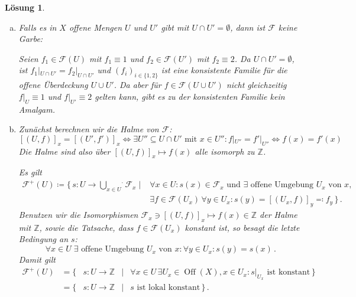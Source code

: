 \documentclass[a4paper,12pt]{report}
\theoremstyle{break}
\newtheorem{Loes}{L\"osung}
\theoremstyle{nonumberbreak}
\theoremstyle{nonumberplain}
\DeclareMathOperator{\Off}{Off}
\newcommand{\Z}{\mathbb{Z}}
\begin{document}
\begin{Loes}
\begin{enumerate}[a)]%
 \item Falls es in $X$ offene Mengen $U$ und $U'$ gibt mit $U \cap U' = \emptyset$, dann ist $\mathcal{F}$ keine Garbe:
 
 Seien $f_1 \in \mathcal{F}(U)$ mit $f_1 \equiv 1$ und $f_2 \in \mathcal{F}(U')$ mit $f_2 \equiv 2$. Da $U \cap U' = \emptyset$, ist $f_1|_{U \cap U'} = {f_2}|_{ U \cap U'}$ und $(f_i)_{i\in \{1,2\}}$ ist eine konsistente Familie f\"ur die offene \"Uberdeckung $U \cup U'$. Da aber f\"ur $f \in \mathcal{F}(U \cup U')$ nicht gleichzeitig $f|_U \equiv 1$ und $f|_{U'} \equiv 2$ gelten kann, gibt es zu der konsistenten Familie kein Amalgam.
 
 \item Zun\"achst berechnen wir die Halme von $\mathcal{F}$: 
 $$[(U,f)]_x = [(U',f')]_x \Leftrightarrow \exists U'' \subseteq U \cap U' \textrm{ mit } x \in U'' : f|_{U''} = f'|_{U''} \Leftrightarrow f(x) = f'(x)$$
 Die Halme sind also \"uber $[(U,f)]_x \mapsto f(x)$ alle isomorph zu $\Z$.
 
 Es gilt 
 $$\begin{array}{cl}
    \mathcal{F}^+(U) \coloneqq \{ \, s \colon U \to \stackrel{.}{\bigcup\limits_{x \in U}} \mathcal{F}_x \mid 
    & \forall x \in U : s(x) \in \mathcal{F}_x \textrm{ und } \exists \textrm{ offene Umgebung } U_x \textrm{ von } x, \\
    & \exists f \in \mathcal{F}(U_x) \, \forall y \in U_x : s(y) = [(U_x,f)]_y \eqqcolon f_y \, \} \, .
   \end{array}$$
 Benutzen wir die Isomorphismen $\mathcal{F}_x \ni [(U,f)]_x \mapsto f(x) \in \Z$ der Halme mit $\Z$, sowie die Tatsache, dass $f \in \mathcal{F}(U_x)$ konstant ist, so besagt die letzte Bedingung an $s$:
 $$\forall x \in U \; \exists \textrm{ offene Umgebung } U_x \textrm{ von } x: \forall y \in U_x: s(y) = s(x) \, .$$
 Damit gilt
  $$\begin{array}{rcccl}
    \mathcal{F}^+(U) &= \{ & s \colon U \to \Z &\mid 
    & \forall x \in U \, \exists U_x \in \Off(X), x \in U_x : s|_{U_x} \textrm{ ist konstant}\, \}\\
    &= \{ & s \colon U \to \Z & \mid & s \textrm{ ist lokal konstant} \, \} \, .
   \end{array}$$
\end{enumerate}
\end{Loes}
\end{document}
